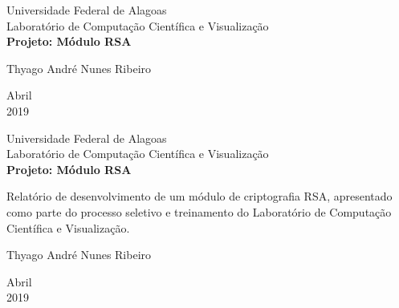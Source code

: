 \documentclass[a4paper, 12pt]{article}
\begin{document}
	\begin{titlepage}
		\begin{center}
			\Huge{Universidade Federal de Alagoas}\\
			\large{Laboratório de Computação Científica e Visualização}\\ 
			\vspace{4 cm}
			\textbf{\LARGE{Projeto: Módulo RSA}}\\
			\vspace{3,5cm}
		\end{center}
		\begin{center}
			Thyago André Nunes Ribeiro
		\end{center}
		\begin{center}
			\vspace{\fill}
			Abril\\2019
		\end{center}
	\end{titlepage}
    
	\begin{titlepage}
		\begin{center}
			\Huge{Universidade Federal de Alagoas}\\
			\large{Laboratório de Computação Científica e Visualização}\\ 
			\vspace{4 cm}
			\textbf{\LARGE{Projeto: Módulo RSA}}
		\end{center}
		\vspace{1,5cm}
		\begin{flushright}
			\begin{list}{}{
				\setlength{\leftmargin}{4.5cm}
				\setlength{\rightmargin}{0cm}
				\setlength{\labelwidth}{0pt}
				\setlength{\labelsep}{\leftmargin}}
				\item Relatório de desenvolvimento de um módulo de criptografia RSA, apresentado como parte do processo seletivo e treinamento do Laboratório de Computação Científica e Visualização.
			\end{list}
			\vspace{3 cm}
			\begin{center}
				Thyago André Nunes Ribeiro
			\end{center}
		\end{flushright}
		\vspace{1cm}
		\begin{center}
			\vspace{\fill}
			Abril\\2019
		\end{center}
	\end{titlepage}
    
\end{document}
